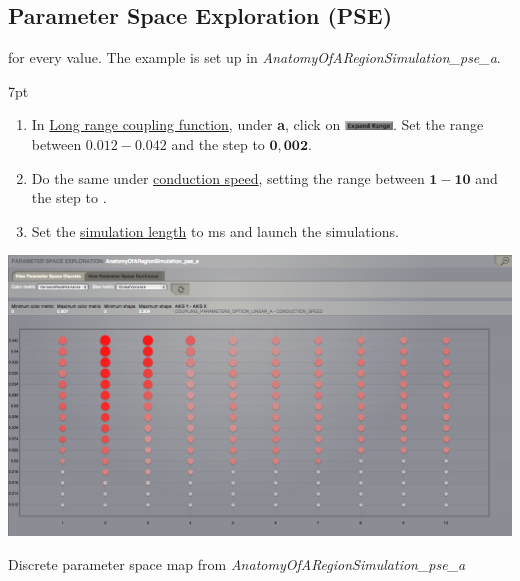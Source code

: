 \documentclass{tufte-handout}
\newenvironment{simulation}{%
  \def\FrameCommand{%
    \hspace{1pt}%
    {\color{ForestGreen}\vrule width 2pt}%
    {\color{simulationshade}\vrule width 4pt}%
    \colorbox{simulationshade}%
  }%
  \MakeFramed{\advance\hsize-\width\FrameRestore}%
  \noindent\hspace{-4.55pt}%
  \begin{adjustwidth}{}{7pt}%
  \vspace{2pt}\vspace{2pt}%
}
{%
  \vspace{2pt}\end{adjustwidth}\endMakeFramed%
}
\begin{document}
 \newpage
\subsection{Parameter Space Exploration (PSE)}\label{sec:pse}

 for
every value.  The example is set up in \textit{AnatomyOfARegionSimulation\_pse\_a}. 

\begin{simulation}
\begin{enumerate}
 \item In \underline{Long range coupling function}, under \textbf{a}, click on \includegraphics[width=0.1\textwidth]{butt_expand_range.png}. 
 Set the range between $\mathbf{0.012-0.042}$ and the step to $\mathbf{0,002}$.
 \item Do the same under \underline{conduction speed}, setting the range between $\mathbf{1-10}$  and the step to \textbf{}.
 
 \item Set the \underline{simulation length} to \unit[2000]{ms} and launch the simulations.
\end{enumerate}
\end{simulation}

\begin{marginfigure}
  \includegraphics[width=\linewidth]{Handout_UI_BuildingYourOwnBrainNetworkModel_PSEDiscrete}%
  \caption{Discrete parameter space map from \textit{AnatomyOfARegionSimulation\_pse\_a}}%
  \label{fig:pse_discrete}%
\end{marginfigure}
\end{document}
